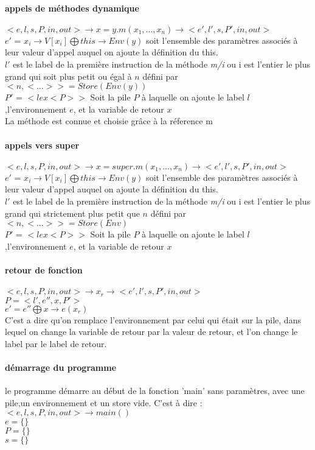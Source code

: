 \paragraph{appels de méthodes dynamique}
$<e,l,s,P,in,out> \rightarrow x = y.m(x_1,...,x_n) \rightarrow <e',l',s,P',in,out>$\\
$e'$ = $x_i \rightarrow V[x_i] \bigoplus this \rightarrow Env(y)$ soit l'ensemble des paramètres associés à leur valeur d'appel auquel
on ajoute la définition du this.\\
$l'$ est le label de la première instruction de la méthode \emph{m/i} ou i est l'entier le plus grand qui soit plus petit ou égal à
$n$ défini par $<n,<...>> = Store(Env(y))$\\
$P'$ = $ < l e x <P>>$ Soit la pile $P$ à laquelle on ajoute le label $l$,l'environnement $e$, et la variable de retour $x$\\
La méthode est connue et choisie grâce à la réference m

\paragraph{appels vers super}
$<e,l,s,P,in,out> \rightarrow x = super.m(x_1,...,x_n) \rightarrow <e',l',s,P',in,out>$\\
$e'$ = $x_i \rightarrow V[x_i] \bigoplus this \rightarrow Env(y)$ soit l'ensemble des paramètres associés à leur valeur d'appel auquel
on ajoute la définition du this.\\
$l'$ est le label de la première instruction de la méthode \emph{m/i} ou i est l'entier le plus grand qui strictement plus petit que 
$n$ défini par $<n,<...>> = Store(Env)$\\
$P'$ = $ < l e x <P>>$ Soit la pile $P$ à laquelle on ajoute le label $l$,l'environnement $e$, et la variable de retour $x$

\paragraph{retour de fonction}
$<e,l,s,P,in,out> \rightarrow x_r \rightarrow <e',l',s,P',in,out>$\\
$P = <l',e'',x,P'>$\\
$e'= e''\bigoplus x \rightarrow e(x_r)$\\
C'est a dire qu'on remplace l'environnement par celui qui était sur la pile, dans lequel
on change la variable de retour par la valeur de retour, et l'on change le label
par le label de retour. 

\paragraph{démarrage du programme}
le programme démarre au début de la fonction 'main' sans paramètres, avec une pile,un environnement et un store vide. C'est à dire : \\
$<e,l,s,P,in,out> \rightarrow main()$ \\
$e = \{\}$\\
$P = \{\}$\\
$s = \{\}$




